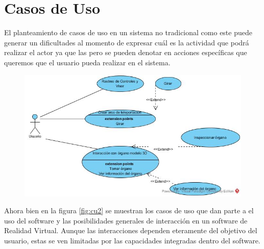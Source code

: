 \section{Casos de Uso}
El planteamiento de casos de uso en un sistema no tradicional como este puede generar un dificultades al momento de expresar cuál es la actividad que podrá 
realizar el actor ya que las  pero se pueden denotar en acciones específicas que queremos que el usuario pueda realizar en el sistema.\\
\begin{figure}[H]
	\begin{center}
 		\includegraphics[width = 1\textwidth]{v3/images/cu1.jpg}
	\end{center} 
\end{figure}
Ahora bien en la figura \ref{fig:cu2} se muestran los casos de uso que dan parte a el uso del software y las posibilidades generales de interacción en un software de 
Realidad Virtual. Aunque las interacciones dependen eteramente del objetivo del usuario, estas se ven limitadas por las capacidades integradas dentro del software.\\


